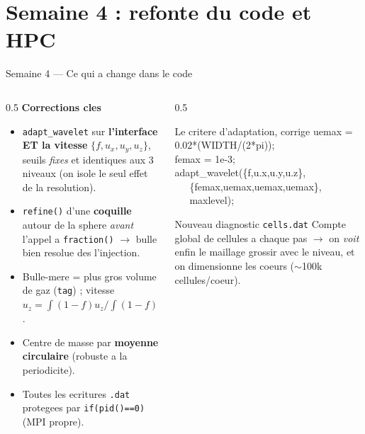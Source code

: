 \documentclass[11pt,aspectratio=169]{beamer}
\begin{document}
\section{Semaine 4 : refonte du code et HPC}
\begin{frame}{Semaine 4 --- Ce qui a change dans le code}
  \footnotesize
  \begin{columns}[T]
    \begin{column}{0.5\textwidth}
      \textbf{Corrections cles}
      \begin{itemize}
        \item \texttt{adapt\_wavelet} sur \textbf{l'interface ET la vitesse}
              $\{f, u_x, u_y, u_z\}$, seuils \emph{fixes} et identiques aux 3
              niveaux (on isole le seul effet de la resolution).
        \item \texttt{refine()} d'une \textbf{coquille} autour de la sphere
              \emph{avant} l'appel a \texttt{fraction()} $\to$ bulle bien
              resolue des l'injection.
        \item Bulle-mere = plus gros volume de gaz (\texttt{tag}) ; vitesse
              $u_z = \int (1-f)u_z / \int (1-f)$.
        \item Centre de masse par \textbf{moyenne circulaire} (robuste a la
              periodicite).
        \item Toutes les ecritures \texttt{.dat} protegees par
              \texttt{if(pid()==0)} (MPI propre).
      \end{itemize}
    \end{column}
    \begin{column}{0.5\textwidth}
      \begin{block}{Le critere d'adaptation, corrige}
        \ttfamily\scriptsize
        uemax = 0.02*(WIDTH/(2*pi));\\
        femax = 1e-3;\\
        adapt\_wavelet(\{f,u.x,u.y,u.z\},\\
        ~~~\{femax,uemax,uemax,uemax\},\\
        ~~~maxlevel);
      \end{block}
      \begin{block}{Nouveau diagnostic \texttt{cells.dat}}
        \scriptsize
        Compte global de cellules a chaque pas $\to$ on \emph{voit} enfin le
        maillage grossir avec le niveau, et on dimensionne les coeurs
        ($\sim$100k cellules/coeur).
      \end{block}
    \end{column}
  \end{columns}
\end{frame}
\end{document}
